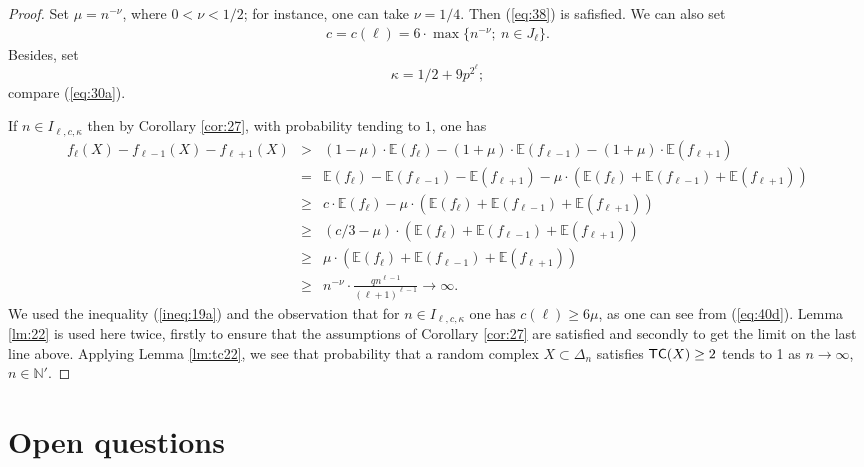 \documentclass[11pt,twoside, reqno]{amsart}
\theoremstyle{plain}
\newtheorem{teo}[lema]{Theorem}
\theoremstyle{definition}
\newcommand{\N}{\mathbb{N}}
\newcommand{\E}{\mathbb{E}}
\newcommand{\tc}{{\sf{TC}}}
\begin{document}
\begin{proof}
Set $\mu=n^{-\nu}$, where $0<\nu<1/2$; for instance, one can take $\nu=1/4$. Then (\ref{eq:38}) is safisfied. 
We can also set 
\begin{eqnarray}\label{eq:40d}
c=c(\ell)= 6\cdot \max\{n^{-\nu};\  n\in J_\ell\}.
\end{eqnarray} 
Besides, set $$\kappa= 1/2 + 9p^{2^{\ell}};$$ compare (\ref{eq:30a}). 

If $n\in I_{\ell, c, \kappa}$ then by Corollary \ref{cor:27}, with probability tending to $1$, one has
\begin{eqnarray*}
f_\ell(X)-f_{\ell-1}(X)-f_{\ell+1}(X) &>& (1-\mu)\cdot \E(f_\ell) -(1+\mu)\cdot \E(f_{\ell-1}) -(1+\mu)\cdot \E(f_{\ell+1})\\
&=& \E(f_\ell)-\E(f_{\ell-1})-\E(f_{\ell+1}) - \mu\cdot(\E(f_\ell) +\E(f_{\ell-1})+\E(f_{\ell+1}))\\
&\ge & c\cdot \E(f_\ell) - \mu\cdot(\E(f_\ell) +\E(f_{\ell-1})+\E(f_{\ell+1}))\\
&\ge& (c/3 -\mu)\cdot (\E(f_\ell) +\E(f_{\ell-1})+\E(f_{\ell+1}))\\
&\ge & \mu \cdot (\E(f_\ell) +\E(f_{\ell-1})+\E(f_{\ell+1}))\\
&\ge & n^{-\nu}\cdot \frac{qn^{\ell-1}}{(\ell+1)^{\ell-1}}\to \infty. 
\end{eqnarray*}
We used the inequality (\ref{ineq:19a}) and the observation that for $n\in I_{\ell,c, \kappa}$ one has $c(\ell) \ge 6\mu$, as one can see from (\ref{eq:40d}). %
Lemma \ref{lm:22} is used here twice, firstly to ensure that the assumptions of Corollary \ref{cor:27} are satisfied and secondly to get 
the limit on the last line above. 
Applying  Lemma \ref{lm:tc22}, we see that probability that a random complex $X\subset \Delta_n$ satisfies $\tc(X)\ge 2$ tends to 1 as $n\to \infty$, $n\in \N'$. 
\end{proof}

\section{Open questions}
\end{document}
